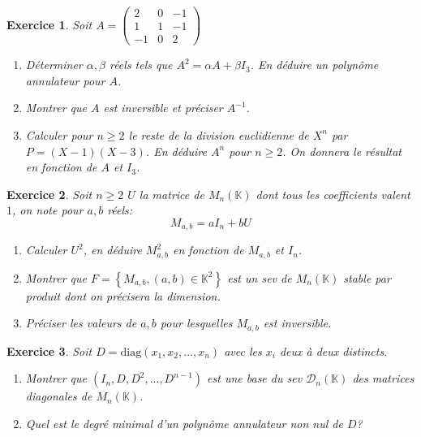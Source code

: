 \documentclass[12pt,a4paper]{article}
\newcommand{\K}{\mathbb{K} }
\newcommand{\diag}{\mathrm{diag}}
\theoremstyle{break}
\theoremstyle{break}
\newtheorem{Exo}{Exercice}
\begin{document}
\begin{Exo}
	Soit $A=\begin{pmatrix}
		2 & 0 & -1 \\
		1 & 1 & -1 \\
		-1 & 0 & 2
	\end{pmatrix}$
	\begin{enumerate}
		\item
		Déterminer $\alpha,\beta$ réels tels que $A^2=\alpha A+\beta I_3$. En déduire un polynôme annulateur pour $A$.
		\item Montrer que $A$ est inversible et préciser $A^{-1}$.
		\item
		Calculer pour $n\geqslant 2$ le reste de la division euclidienne de $X^n$ par $P=(X-1)(X-3)$.
		En déduire $A^n$ pour $n\geqslant 2$. On donnera le résultat en fonction de $A$ et $I_3$.
	\end{enumerate}	
	
\end{Exo}

\begin{Exo}
	Soit $n\geqslant 2$ $U$ la matrice de $M_n(\K)$ dont tous les coefficients valent $1$, on note pour $a,b$ réels:
	$$M_{a,b}=aI_n+bU$$
	\begin{enumerate}
		\item
		Calculer $U^2$, en déduire $M_{a,b}^2$ en fonction de $M_{a,b}$ et $I_n$.
		\item Montrer que $F=\left\{M_{a,b},(a,b)\in\K^2\right\}$ est un sev de $M_n(\K)$ stable par produit dont on précisera la dimension.
		\item
		Préciser les valeurs de $a,b$ pour lesquelles $M_{a,b}$ est inversible.
	\end{enumerate}
\end{Exo}

\begin{Exo}
	Soit $D=\diag(x_1,x_2,...,x_n)$ avec les $x_i$ deux à deux distincts.
	\begin{enumerate}
		\item
		Montrer que $(I_n,D,D^2,...,D^{n-1})$ est une base du sev $\mathcal{D}_n(\K)$ des matrices diagonales de $M_n(\K)$.
		\item
		Quel est le degré minimal d'un polynôme annulateur non nul de $D$?
	\end{enumerate}	
\end{Exo}
\end{document}
